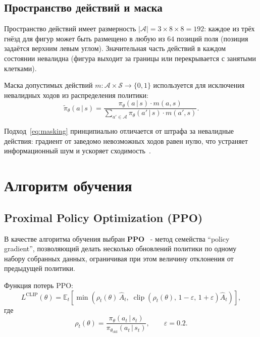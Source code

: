 \documentclass[12pt, a4paper]{article}
\newcommand{\given}{\,|\,}
\DeclareMathOperator*{\clip}{clip}
\begin{document}
\subsection{Пространство действий и маска}

Пространство действий имеет размерность $|\mathcal{A}| = 3 \times 8 \times 8 = 192$: каждое из трёх гнёзд для фигур может быть размещено в любую из $64$ позиций поля (позиция задаётся верхним левым углом). Значительная часть действий в каждом состоянии невалидна (фигура выходит за границы или перекрывается с занятыми клетками).

Маска допустимых действий $m: \mathcal{A} \times \mathcal{S} \to \{0, 1\}$ используется для исключения невалидных ходов из распределения политики:
\begin{equation}
  \tilde{\pi}_\theta(a \given s)
  = \frac{\pi_\theta(a \given s)\cdot m(a,s)}{\displaystyle\sum_{a' \in \mathcal{A}} \pi_\theta(a' \given s)\cdot m(a',s)}.
  \label{eq:masking}
\end{equation}

Подход~\eqref{eq:masking} принципиально отличается от штрафа за невалидные действия: градиент от заведомо невозможных ходов равен нулю, что устраняет информационный шум и ускоряет сходимость~\cite{huang2020}.

\section{Алгоритм обучения}

\subsection{Proximal Policy Optimization (PPO)}

В качестве алгоритма обучения выбран \textbf{PPO}~\cite{schulman2017} - метод семейства ``policy gradient'', позволяющий делать несколько обновлений политики по одному набору собранных данных, ограничивая при этом величину отклонения от предыдущей политики.

Функция потерь PPO:
\begin{equation}
  L^{\text{CLIP}}(\theta)
  = \mathbb{E}_t\!\left[
      \min\!\left(
        \rho_t(\theta)\,\hat{A}_t,\;
        \clip\!\left(\rho_t(\theta),\,1-\varepsilon,\,1+\varepsilon\right)\hat{A}_t
      \right)
    \right],
  \label{eq:ppo}
\end{equation}
где
\begin{equation}
  \rho_t(\theta) = \frac{\pi_\theta(a_t \given s_t)}{\pi_{\theta_\text{old}}(a_t \given s_t)}, \qquad \varepsilon = 0.2.
\end{equation}
\end{document}
